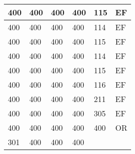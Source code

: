 \begin{table}[]
\begin{tabular}{lllll|l|}
400                                 & 400                                & 400                                & 400                                & 
115                                & EF                                    \\ \hline
400                                 & 400                                & 400                                & 400                                & 
114                                & EF                                    \\ \hline
400                                 & 400                                & 400                                & 400                                & 
115                                & EF                                    \\ \hline
400                                 & 400                                & 400                                & 400                                & 
114                                & EF                                    \\ \hline
400                                 & 400                                & 400                                & 400                                & 
115                                & EF                                    \\ \hline
400                                 & 400                                & 400                                & 400                                & 
116                                & EF                                    \\ \hline
400                                 & 400                                & 400                                & 400                                & 
211                                & EF                                    \\ \hline
400                                 & 400                                & 400                                & 400                                & 
305                                & EF                                    \\ \hline
400                                 & 400                                & 400                                & 400                                & 
400                                & OR                                    \\ \hline
301                                 & 400                                & 400                                & 400                                & 

\end{tabular}
\end{table}
